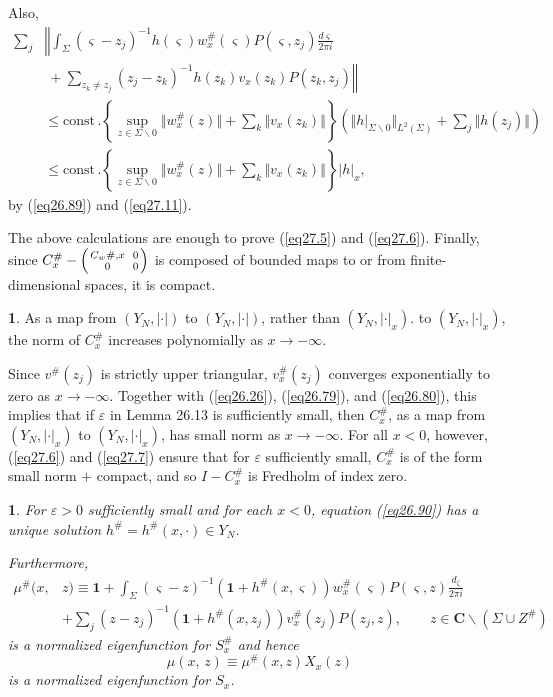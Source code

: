 \documentclass{surv-l}
\theoremstyle{plain}
\newtheorem{prop}[theorem]{\sc{Proposition}}
\theoremstyle{definition}
\newtheorem{remark}[theorem]{\sc{Remark}}
\numberwithin{equation}{chapter}
\begin{document}
Also,
\begin{align*}
\sum_{j}&\left\Vert\int_{\Sigma}(\varsigma-z_{j})^{-1}h(\varsigma)w_{x}^{\#} (\varsigma)P(\varsigma,z_{j})\frac{d\varsigma}{2\pi i}\right.\\
&\left.\ +\sum_{z_{k}\neq z_{j}}(z_{j}-z_{k})^{-1}h(z_{k})v_{x}(z_{k})P(z_{k}, z_{j})\right\Vert\\
&\leq\mathrm{const}\,.\left\{\sup_{z\in\Sigma\backslash 0}\Vert w_{x}^{\#}(z)\Vert+\sum_{k}\Vert v_{x}(z_{k})\Vert\right\}\left(\Vert h|_{\Sigma\backslash 0}\Vert_{L^{2}(\Sigma)}+\sum_{j}\Vert h(z_{j})\Vert\right)\\
&\leq \mathrm{const}\,.\left\{\sup_{z\in\Sigma\backslash 0}\Vert w_{x}^{\#}(z)\Vert+\sum_{k}\Vert v_{x}(z_{k})\Vert\right\}|h|_{x},
\end{align*}
by (\ref{eq26.89}) and (\ref{eq27.11}).

The above calculations are enough to prove (\ref{eq27.5}) and (\ref{eq27.6}). Finally, since $C_{x}^{\#}- \left(
{C_{w}\#,x\atop 0}\ {0\atop 0}\right)$ is composed of bounded maps to or from finite-dimensional spaces, it is compact.
\setcounter{theorem}{11}
\begin{remark}\label{rem27.12} As a map from $(Y_{N}, |\cdot|)$ to $(Y_{N}, |\cdot|)$, rather than $(Y_{N}, |\cdot|_{x})$. to $(Y_{N}, |\cdot|_{x})$, the norm of $C_{x}^{\#}$ increases polynomially as $ x\rightarrow-\infty$.

Since $v^{\#}(z_{j})$ is strictly upper triangular, $v_{x}^{\#}(z_{j})$ converges exponentially to zero as $x \rightarrow-\infty$. Together with (\ref{eq26.26}), (\ref{eq26.79}), and (\ref{eq26.80}), this implies that if $\varepsilon$ in Lemma 26.13 is sufficiently small, then $C_{x}^{\#}$, as a map from $(Y_{N}, |\cdot|_{x})$ to $(Y_{N}, |\cdot|_{x})$, has small norm as $x \rightarrow-\infty$. For all $x<0$, however, (\ref{eq27.6}) and (\ref{eq27.7}) ensure that for $\varepsilon$ sufficiently small, $ C_{x}^{\#}$ is of the form small norm $+$ compact, and so $I-C_{x}^{\#}$ is Fredholm of index zero.
\end{remark}

\begin{prop}\label{pro27.13}
For $\varepsilon >0$ sufficiently small and for each $x<0$, equation
\emph{(\ref{eq26.90})} has a unique solution $h^{\#} =h^{\#}(x, \cdot)\in Y_{N}$.

Furthermore,
\setcounter{equation}{13}
\begin{align}\label{eq27.14}
\mu^{\#}(x, &z)\equiv \mathbf{1} + \int_{\Sigma}(\varsigma-z)^{-1}(\mathbf{1} +h^{\#}(x,\varsigma))w_{x}^{\#} (\varsigma)P(\varsigma, z)\frac{d_{\zeta}}{2\pi i}\\
&+\sum_{j}(z-z_{j})^{-1}(\mathbf{1}+h^{\#} (x, z_{j}))v_{x}^{\#}(z_{j})P(z_{j},z),\qquad z\in \mathbf{C}\backslash (\Sigma\cup Z^{\#})\nonumber
\end{align}
is a normalized eigenfunction for $S_{x}^{\#}$ and hence
\begin{equation}\label{eq27.15}
\mu(x,\, z)\equiv\mu^{\#}(x,z)X_{x}(z)
\end{equation}
is a normalized eigenfunction for $S_{x}$.
\end{prop}
\end{document}
